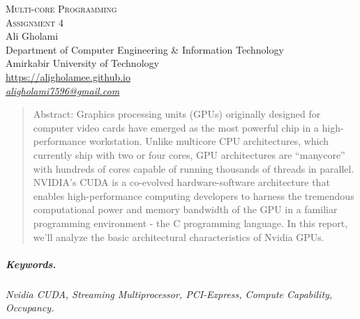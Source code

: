 \documentclass[12pt]{article}
\numberwithin{equation}{section}
\numberwithin{table}{section}
\numberwithin{figure}{section}
\begin{document}

\begin{center}
\textsc{\Huge Multi-core Programming} \\[2pt]
	\textsc{\Large Assignment 4}\\
	\vspace{0.5cm}
  Ali Gholami \\[6pt]
  Department of Computer Engineering \& Information Technology\\
  Amirkabir University of Technology  \\[6pt]
  \def\UrlFont{\em}
  \url{https://aligholamee.github.io}\\
\href{mailto:aligholami7596@gmail.com}{\textit{aligholami7596@gmail.com}}
\end{center}

\begin{abstract}
Abstract:
Graphics processing units (GPUs) originally designed for computer video cards have emerged as the most powerful chip in a high-performance workstation. Unlike multicore CPU architectures, which currently ship with two or four cores, GPU architectures are “manycore” with hundreds of cores capable of running thousands of threads in parallel. NVIDIA’s CUDA is a co-evolved hardware-software architecture that enables high-performance computing developers to harness the tremendous computational power and memory bandwidth of the GPU in a familiar programming environment - the C programming language. In this report, we'll analyze the basic architectural characteristics of Nvidia GPUs.
\end{abstract} 

\subparagraph{Keywords.} \textit{Nvidia CUDA, Streaming Multiprocessor, PCI-Express, Compute Capability, Occupancy.}
\end{document}
